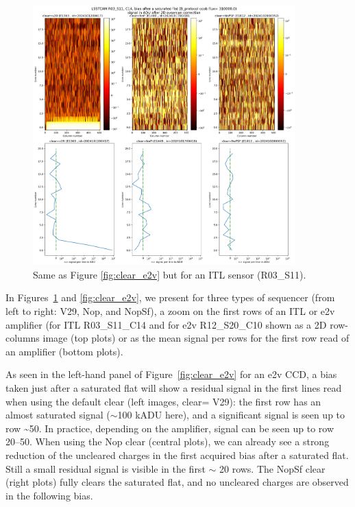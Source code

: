\begin{figure}[ht]
\begin{centering}
\includegraphics[width=0.9\textwidth]{figures/plots_R03_S11_C14_E1812_bias_2024102800352.png}
\end{centering}
\caption{Same as Figure \ref{fig:clear_e2v} but for an ITL sensor (R03\_S11).}
\label{fig:clear_ITL}
\end{figure}


In Figures~\ref{fig:clear_ITL} and \ref{fig:clear_e2v}, we present for three types of sequencer (from left to
right: V29, Nop, and NopSf), a zoom on the first rows of an ITL or e2v
amplifier (for ITL R03\_S11\_C14 and for e2v
R12\_S20\_C10 shown as a 2D row-columns
image (top plots) or as the mean signal per rows for the first row
read of an amplifier (bottom plots).

As seen in the left-hand panel of Figure~\ref{fig:clear_e2v}
for an e2v CCD, a bias taken just after a saturated flat will show a
residual signal in the first lines read when using the default clear
(left images, clear= V29): the first row has an almost saturated signal
($\sim$100 kADU here), and a significant signal is seen up
to row \textasciitilde50. In practice, depending on the 
amplifier, signal can be seen up to row 20--50. When using the Nop clear
(central plots), we can already see a strong reduction of the uncleared
charges in the first acquired bias after a saturated flat.  Still a small
residual signal is visible in the first $\sim$ 20 rows. The
NopSf clear (right plots) fully clears the saturated flat, and no
uncleared charges are observed in the following bias.


